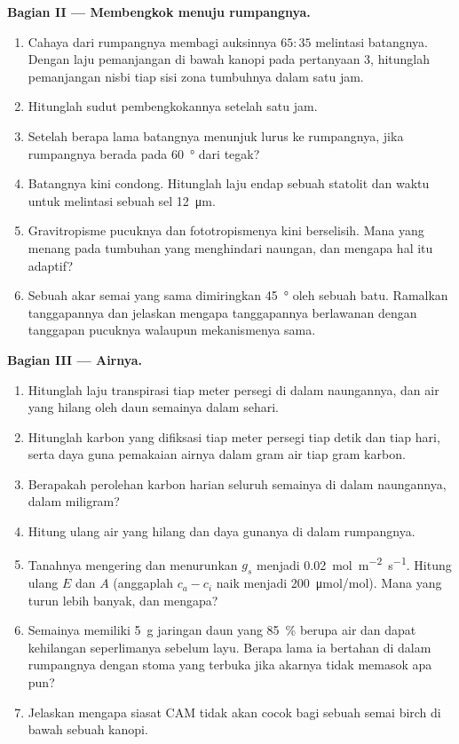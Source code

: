 \begin{problem}
\medskip
\noindent\textbf{Bagian II --- Membengkok menuju rumpangnya.}
\begin{enumerate}[resume]
  \item Cahaya dari rumpangnya membagi auksinnya $65 : 35$ melintasi
        batangnya. Dengan laju pemanjangan di bawah kanopi pada
        pertanyaan 3, hitunglah pemanjangan nisbi tiap sisi zona
        tumbuhnya dalam satu jam.
  \item Hitunglah sudut pembengkokannya setelah satu jam.
  \item Setelah berapa lama batangnya menunjuk lurus ke rumpangnya,
        jika rumpangnya berada pada \qty{60}{\degree} dari tegak?
  \item Batangnya kini condong. Hitunglah laju endap sebuah statolit
        dan waktu untuk melintasi sebuah sel \qty{12}{\micro m}.
  \item Gravitropisme pucuknya dan fototropismenya kini berselisih.
        Mana yang menang pada tumbuhan yang menghindari naungan, dan
        mengapa hal itu adaptif?
  \item Sebuah akar semai yang sama dimiringkan \qty{45}{\degree} oleh
        sebuah batu. Ramalkan tanggapannya dan jelaskan mengapa
        tanggapannya berlawanan dengan tanggapan pucuknya walaupun
        mekanismenya sama.
\end{enumerate}

\medskip
\noindent\textbf{Bagian III --- Airnya.}
\begin{enumerate}[resume]
  \item Hitunglah laju transpirasi tiap meter persegi di dalam
        naungannya, dan air yang hilang oleh daun semainya dalam sehari.
  \item Hitunglah karbon yang difiksasi tiap meter persegi tiap detik
        dan tiap hari, serta daya guna pemakaian airnya dalam gram air
        tiap gram karbon.
  \item Berapakah perolehan karbon harian seluruh semainya di dalam
        naungannya, dalam miligram?
  \item Hitung ulang air yang hilang dan daya gunanya di dalam
        rumpangnya.
  \item Tanahnya mengering dan  menurunkan $g_s$ menjadi
        \qty{0.02}{mol.m^{-2}.s^{-1}}. Hitung ulang $E$ dan $A$
        (anggaplah $c_a - c_i$ naik menjadi \qty{200}{\micro mol/mol}).
        Mana yang turun lebih banyak, dan mengapa?
  \item Semainya memiliki \qty{5}{g} jaringan daun yang \qty{85}{\%}
        berupa air dan dapat kehilangan seperlimanya sebelum layu.
        Berapa lama ia bertahan di dalam rumpangnya dengan stoma yang
        terbuka jika akarnya tidak memasok apa pun?
  \item Jelaskan mengapa siasat CAM tidak akan cocok bagi sebuah semai
        birch di bawah sebuah kanopi.
\end{enumerate}


\end{problem}
